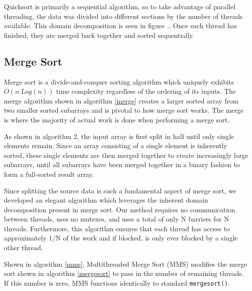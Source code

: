 \documentclass[journal]{IEEEtran}
\begin{document}
Quicksort is primarily a sequential algorithm, so to take advantage of parallel threading, the data was divided into different sections by the number of threads available.  This domain decomposition is seen in figure ..  Once each thread has finished, they are merged back together and sorted sequentially. 


%		
%			
%			
%
%    
%

\subsection{Merge Sort}
Merge sort is a divide-and-conquer sorting algorithm which uniquely exhibits $O(n\ Log(n))$ time complexity regardless of the ordering of its inputs.  The merge algorithm shown in algorithm \ref{merge} creates a larger sorted array from two smaller sorted subarrays and is pivotal to how merge sort works.  The merge is where the majority of actual work is done when performing a merge sort.   

As shown in algorithm 2, the input array is first split in half until only single elements remain.  Since an array consisting of a single element is inherently sorted, these single elements are then merged together to create increasingly large subarrays, until all subarrays have been merged together in a binary fashion to form a full-sorted result array.

Since splitting the source data is such a fundamental aspect of merge sort, we developed an elegant algorithm which leverages the inherent domain decomposition present in merge sort.  Our method requires no communication between threads, uses no mutexes, and uses a total of only N barriers for N threads.  Furthermore, this algorithm ensures that each thread has access to approximately 1/N of the work and if blocked, is only ever blocked by a single other thread.  

Shown in algorithm \ref{mms}, Multithreaded Merge Sort (MMS) modifies the merge sort shown in algorithm \ref{mergesort} to pass in the number of remaining threads.  If this number is zero, MMS functions identically to standard \texttt{mergesort()}. 
\end{document}
